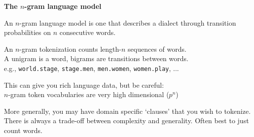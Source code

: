 \documentclass[11pt,xcolor=svgnames]{beamer}
\newcommand{\theme}{\color{Maroon}}
\newcommand{\gr}{\color{black!60}}
\newcommand{\sg}{\color{DarkSlateGray}}
\newcommand{\nv}{\color{Navy}}
\newcommand{\sk}{\vspace{.5cm}}
\begin{document}

\begin{frame}

{\bf\theme The $n$-gram language model}

\sk 
An $n$-gram language model is one that describes a dialect through
transition probabilities on $n$ consecutive words.


\sk
An {\theme $n$-gram tokenization} counts
length-$n$ sequences of words.\\
{\sg A unigram is a word, bigrams are transitions between words.}\\
{\gr e.g., {\tt world.stage}, {\tt stage.men}, {\tt men.women}, {\tt women.play}, ...}


\sk
This can give you rich language data, but be careful:\\
$n$-gram token vocabularies are very high dimensional ($p^n$)

\sk More generally, you may have domain specific `clauses' that you wish to tokenize.
There is always a trade-off between complexity and generality.  {\theme Often best to just count words.}
\end{frame}
\end{document}
